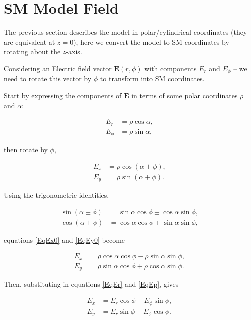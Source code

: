 \documentclass[]{article}
\begin{document}
\section{SM Model Field}

	The previous section describes the model in polar/cylindrical coordinates (they are equivalent at $z=0$), here we convert the model to SM coordinates by rotating about the $z$-axis.
	
	Considering an Electric field vector $\mathbf{E}(r,\phi)$ with components $E_r$ and $E_\phi$ -- we need to rotate this vector by $\phi$ to transform into SM coordinates.
	
	Start by expressing the components of $\mathbf{E}$ in terms of some polar coordinates $\rho$ and $\alpha$:
	
	\begin{align}
		E_r &= \rho \cos{\alpha}, \label{EqEr}\\
		E_\phi &= \rho \sin{\alpha}, \label{EqEp}
	\end{align}
	
	then rotate by $\phi$,
	
	\begin{align}
		E_x &= \rho \cos{(\alpha + \phi)}, \label{EqEx0}\\
		E_y &= \rho \sin{(\alpha + \phi)}. \label{EqEy0}		
	\end{align}
	
	Using the trigonometric identities,
	
	\begin{align}
		\sin{(\alpha \pm \phi)} &= \sin\alpha\cos\phi \pm \cos\alpha\sin\phi, \\
		\cos{(\alpha \pm \phi)} &= \cos\alpha\cos\phi \mp \sin\alpha\sin\phi,
	\end{align}
	
	equations \ref{EqEx0} and \ref{EqEy0} become 
	
	\begin{align}
		E_x &= \rho\cos\alpha\cos\phi - \rho\sin\alpha\sin\phi, \\
		E_y &= \rho\sin\alpha\cos\phi + \rho\cos\alpha\sin\phi.
	\end{align}
	
	Then, substituting in equations \ref{EqEr} and \ref{EqEp}, gives
	
	\begin{align}
		E_x &= E_r\cos\phi - E_\phi\sin\phi, \\
		E_y &= E_r\sin\phi + E_\phi\cos\phi.
	\end{align}



\end{document}
